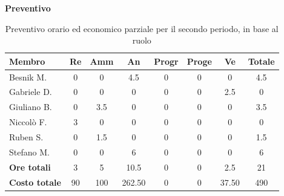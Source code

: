 \documentclass[a4paper,10pt]{article}
\begin{document}
\textbf{Preventivo} \\
\begin{table}[H]
\centering
\begin{tabular}{|l|c|c|c|c|c|c|c|}
\hline
\textbf{Membro} & \textbf{Re} & \textbf{Amm} & \textbf{An} & \textbf{Progr} & \textbf{Proge} & \textbf{Ve} & \textbf{Totale} \\
\hline
Besnik M.  & 0 & 0 & 4.5 & 0 & 0 & 0 & 4.5 \\
Gabriele D. & 0 & 0 & 0 & 0 & 0 & 2.5 & 0 \\
Giuliano B. & 0 & 3.5 & 0 & 0 & 0 & 0 & 3.5 \\
Niccolò F.  & 3 & 0 & 0 & 0 & 0 & 0 & 0 \\
Ruben S. & 0 & 1.5 & 0 & 0 & 0 & 0 & 1.5 \\
Stefano M. & 0 & 0 & 6 & 0 & 0 & 0 & 6 \\
\hline
\textbf{Ore totali} & 3 & 5 & 10.5 & 0 & 0 & 2.5 & 21 \\
\hline
\textbf{Costo totale} & 90 & 100 & 262.50 & 0 & 0 & 37.50 & 490 \\
\hline
\end{tabular}
\caption{Preventivo orario ed economico parziale per il secondo periodo, in base al ruolo}
\end{table}
\end{document}
